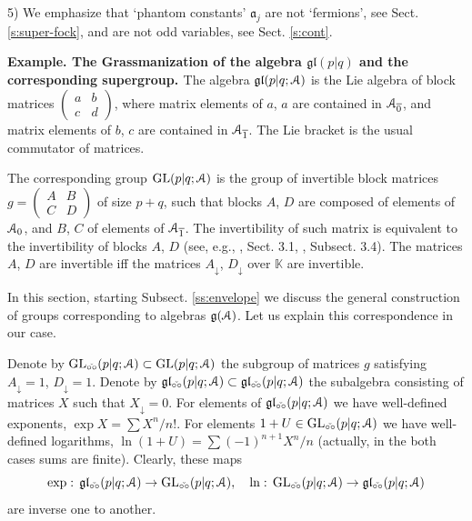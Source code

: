 \documentclass[]{amsart}
\newcounter{sec}
\newcounter{punct}[sec]
\def\punct{\refstepcounter{punct}{\arabic{sec}.\arabic{punct}.  }}
\def\GL{\mathrm  {GL}}
\def\cA{\EuScript A}
\def\fra{\mathfrak a}
\def\frg{\mathfrak g}
\def\frl{\mathfrak l}
\def\C {{\mathbb C }}
\def\K{{\mathbb K}}
\def\ov{\overline}
\def\sm{\smallskip}
\def\0{{\ov 0}}
\def\1{{\ov 1}}
\def\vel{{\check{\circ\circ}}}
\begin{document}
\sm

5) We emphasize that `phantom constants' $\fra_j$ are not `fermions', 
see Sect. \ref{s:super-fock}, and are not odd variables, see Sect. \ref{s:cont}.

\sm


{\bf\punct Example. The Grassmanization of the algebra
$\frg\frl(p|q)$ and the corresponding
supergroup.%
\label{ss:gl-group}}
 The algebra $\frg\frl(p|q;\cA)$ is the Lie algebra of block
matrices $\begin{pmatrix}a& b\\ c&d\end{pmatrix}$, where
matrix elements of $a$, $a$ are contained in $\cA_\0$, and
matrix elements of $b$, $c$ are contained in $\cA_\1$.
The Lie bracket is the usual commutator of matrices.



The corresponding group 
$\GL(p|q;\cA)$ is the group
of invertible block matrices $g=\begin{pmatrix}A&B\\C&D\end{pmatrix}$
of size $p+q$, such that blocks $A$, $D$ are composed of elements 
of $\cA_0$, and $B$, $C$ of elements of $\cA_{\ov 1}$.
The invertibility of such matrix is equivalent to
the invertibility of blocks $A$, $D$ (see, e.g., \cite{Ber-super}, Sect. 3.1, \cite{Rog}, Subsect. 3.4). The matrices 
$A$, $D$ are invertible iff
the matrices  
$A_\downarrow$, $D_\downarrow$ over $\K$ are invertible.


In this section, starting Subsect. \ref{ss:envelope}
we discuss the general construction of groups corresponding to algebras $\frg(\cA)$.
Let us explain this correspondence in our case.

Denote by $\GL_\vel(p|q;\cA)\subset \GL(p|q;\cA)$
 the subgroup of matrices $g$
satisfying $A_\downarrow=1$, $D_\downarrow=1$.
Denote by  $\frg\frl_\vel(p|q;\cA)\subset\frg\frl_\vel(p|q;\cA)$
the subalgebra consisting of matrices $X$ such that $X_\downarrow=0$.
For elements of $\frg\frl_\vel(p|q;\cA)$ we have well-defined
exponents, $\exp X= \sum X^n/n!$. For elements $1+U\in \GL_\vel(p|q;\cA)$
we have well-defined logarithms, $\ln(1+U)=\sum (-1)^{n+1} X^n/n$
(actually, in the both cases sums are finite). Clearly,
these maps
$$
\exp:\,\frg\frl_\vel(p|q;\cA)\to \GL_\vel(p|q;\cA),\quad 
\ln:\, \GL_\vel(p|q;\cA)\to \frg\frl_\vel(p|q;\cA) 
$$
are inverse one to another.

\sm 
 
\end{document}
